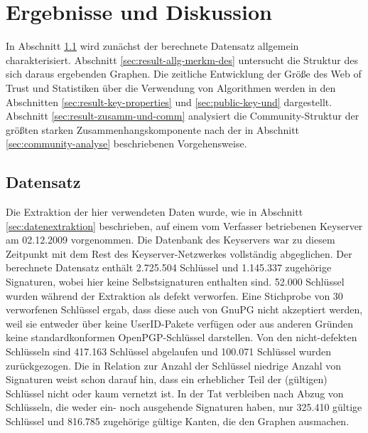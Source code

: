 
\chapter{Ergebnisse und Diskussion}
\label{ch:Ergebnisse}
In Abschnitt \ref{sec:datensatz} wird zunächst der berechnete
Datensatz allgemein charakterisiert. Abschnitt
\ref{sec:result-allg-merkm-des} untersucht die Struktur des sich
daraus ergebenden Graphen. Die zeitliche Entwicklung der Gr\"o{\ss}e des
Web of Trust und Statistiken \"uber die Verwendung von Algorithmen
werden in den Abschnitten \ref{sec:result-key-properties} und
\ref{sec:public-key-und} dargestellt. Abschnitt
\ref{sec:result-zusamm-und-comm} analysiert die Community-Struktur der
größten starken Zusammenhangskomponente nach der in Abschnitt
\ref{sec:community-analyse} beschriebenen Vorgehensweise.

\section{Datensatz}
\label{sec:datensatz}

Die Extraktion der hier verwendeten Daten wurde, wie in Abschnitt
\ref{sec:datenextraktion} beschrieben, auf einem vom
Verfasser betriebenen Keyserver am 02.12.2009 vorgenommen. Die
Datenbank des Keyservers war zu diesem Zeitpunkt mit dem Rest des
Keyserver-Netzwerkes vollständig abgeglichen. Der berechnete
Datensatz enthält 2.725.504 Schlüssel und 1.145.337 zugehörige
Signaturen, wobei hier keine Selbstsignaturen enthalten sind. 52.000
Schlüssel wurden während der Extraktion als defekt verworfen. Eine
Stichprobe von 30 verworfenen Schlüssel ergab, dass diese auch von
GnuPG nicht akzeptiert werden, weil sie entweder über keine
UserID-Pakete verfügen oder aus anderen Gründen keine
standardkonformen OpenPGP-Schlüssel darstellen. Von den
nicht-defekten Schlüsseln sind 417.163 Schlüssel abgelaufen und
100.071 Schlüssel wurden zurückgezogen. Die in Relation zur Anzahl
der Schlüssel niedrige Anzahl von Signaturen weist schon darauf hin,
dass ein erheblicher Teil der (gültigen) Schlüssel nicht oder kaum
vernetzt ist. In der Tat verbleiben nach Abzug von Schlüsseln, die
weder ein- noch ausgehende Signaturen haben, nur 325.410 gültige
Schlüssel und 816.785 zugehörige gültige Kanten, die den Graphen
ausmachen.

